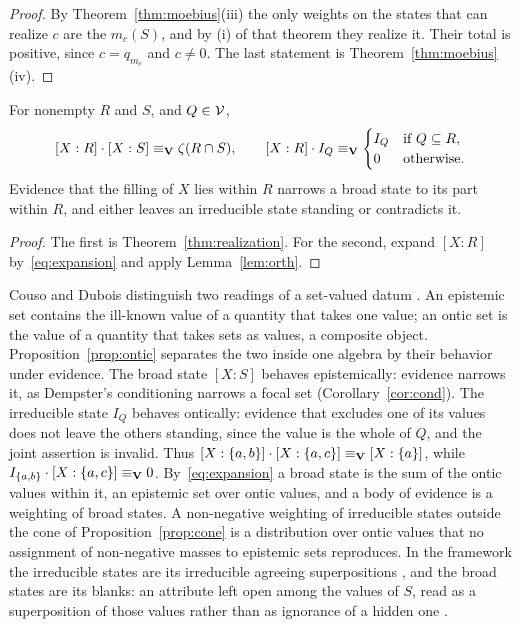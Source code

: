 \begin{proof}
By Theorem~\ref{thm:moebius}(iii) the only weights on the states that can realize $c$ are the $m_c(S)$, and by (i) of that theorem they realize it. Their total is positive, since $c = q_{m_c}$ and $c \neq 0$. The last statement is Theorem~\ref{thm:moebius}(iv).
\end{proof}

\begin{proposition}\label{prop:ontic}
For nonempty $R$ and $S$, and $Q \in \mathcal{V}$,
\[
[X:R]\cdot[X:S] \equiv_{\mathbf{V}} \zeta(R \cap S), \qquad
[X:R]\cdot I_Q \equiv_{\mathbf{V}}
\begin{cases}
I_Q & \text{if } Q \subseteq R,\\
0 & \text{otherwise.}
\end{cases}
\]
Evidence that the filling of $X$ lies within $R$ narrows a broad state to its part within $R$, and either leaves an irreducible state standing or contradicts it.
\end{proposition}

\begin{proof}
The first is Theorem~\ref{thm:realization}. For the second, expand $[X:R]$ by~\eqref{eq:expansion} and apply Lemma~\ref{lem:orth}.
\end{proof}

Couso and Dubois distinguish two readings of a set-valued datum \cite{couso2014}. An epistemic set contains the ill-known value of a quantity that takes one value; an ontic set is the value of a quantity that takes sets as values, a composite object. Proposition~\ref{prop:ontic} separates the two inside one algebra by their behavior under evidence. The broad state $[X:S]$ behaves epistemically: evidence narrows it, as Dempster's conditioning narrows a focal set (Corollary~\ref{cor:cond}). The irreducible state $I_Q$ behaves ontically: evidence that excludes one of its values does not leave the others standing, since the value is the whole of $Q$, and the joint assertion is invalid. Thus $[X:\{a,b\}]\cdot[X:\{a,c\}] \equiv_{\mathbf{V}} [X:\{a\}]$, while $I_{\{a,b\}}\cdot[X:\{a,c\}] \equiv_{\mathbf{V}} 0$. By~\eqref{eq:expansion} a broad state is the sum of the ontic values within it, an epistemic set over ontic values, and a body of evidence is a weighting of broad states. A non-negative weighting of irreducible states outside the cone of Proposition~\ref{prop:cone} is a distribution over ontic values that no assignment of non-negative masses to epistemic sets reproduces. In the framework the irreducible states are its irreducible agreeing superpositions \cite{Aethus, AethusUnion}, and the broad states are its blanks: an attribute left open among the values of $S$, read as a superposition of those values rather than as ignorance of a hidden one \cite{AethusTree}.

